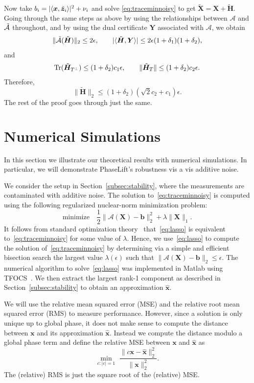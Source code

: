 \documentclass[11pt]{article}
\newcommand{\<}{\langle}
\renewcommand{\>}{\rangle}
\newcommand{\bx}{\bm{x}}
\newcommand{\bX}{\bm{X}}
\newcommand{\bH}{\bm{H}}
\newcommand{\bY}{\bm{Y}}
\newcommand{\bb}{\bm{b}}
\newcommand{\bu}{\bm{u}}
\newcommand{\be}{\bm{e}}
\newcommand{\tr}{\operatorname{Tr}}
\numberwithin{equation}{section}
\newcommand{\cA}{\mathcal{A}}
\begin{document}
Now take $b_i = |\<\bx,\tbz_i\>|^2 + \nu_i$ and solve
\eqref{eq:traceminnoisy} to get $\tilde{\bX} = \bX +
\tilde{\bH}$. Going through the same steps as above by using the
relationships between $\cA$ and $\tcA$ throughout, and by using the
dual certificate $\bY$ associated with $\cA$, we obtain
\[
\|\tcA(\tilde{\bH})\|_2 \leq 2\epsilon, \qquad |\<\tilde{\bH},\bY \>|
\leq 2\epsilon(1+\delta_1)(1+\delta_2),
\]
and
\[
\tr(\tilde{\bH}_{\Tp}) \leq (1+\delta_2)c_1 \epsilon, \qquad \|\tilde{\bH}_{T}\| \leq
(1+\delta_2)c_2 \epsilon.
\]
Therefore, 
\[
\|\tilde{\bH}\|_2 \leq (1+\delta_2)(\sqrt{2}c_2+c_1)\epsilon.
\]
The rest of the proof goes through just the same.





\section{Numerical Simulations}
\label{sec:numerics}

In this section we illustrate our theoretical results with numerical
simulations. In particular, we will demonstrate PhaseLift's robustness
vis a vis additive noise.

We consider the setup in Section~\ref{subsec:stability}, where the
measurements are contaminated with additive noise.  The solution
to~\eqref{eq:traceminnoisy} is computed using the following
regularized nuclear-norm minimization problem:
\begin{equation}
\label{eq:lasso}
\text{minimize} \quad  \frac{1}{2} \|\cA(\bX) - \bb\|_2^2 + \lambda \|\bX\|_1.
\end{equation}
It follows from standard optimization theory~\cite{Roc70}
that~\eqref{eq:lasso} is equivalent to~\eqref{eq:traceminnoisy} for
some value of $\lambda$.  Hence, we use~\eqref{eq:lasso} to compute the
solution of~\eqref{eq:traceminnoisy} by determining via a simple and
efficient bisection search the largest value $\lambda(\epsilon)$ such
that $\|\cA(\bX) - \bb\|_2 \le \epsilon$.  The numerical algorithm to
solve~\eqref{eq:lasso} was implemented in Matlab using
TFOCS~\cite{BCG10}.  We then extract the largest rank-1 component as
described in Section~\ref{subsec:stability} to obtain an approximation
$\hat{\bx}$.

We will use the relative mean squared error (MSE) and the relative
root mean squared error (RMS) to measure performance. However, since a
solution is only unique up to global phase, it does not make sense to
compute the distance between $\bx$ and its approximation $\hat{\bx}$.
Instead we compute the distance modulo a global phase term and define
the relative MSE between $\bx$ and $\hat{\bx}$ as
\[
\min_{c : |c| = 1} \,\, \frac{\|c \bx - \hat{\bx}\|_2^2}{\|\bx\|_2^2}.
\]
The (relative) RMS is just the square root of the (relative) MSE.
\end{document}
